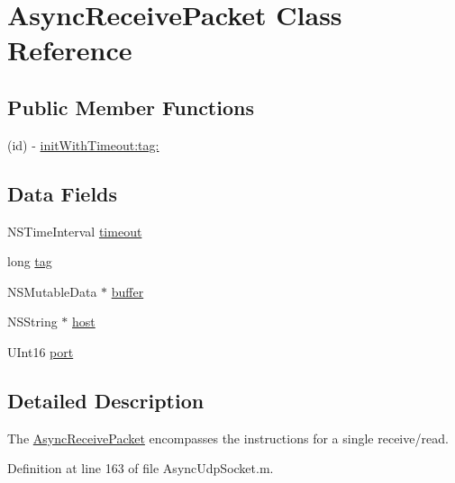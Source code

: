 \hypertarget{interface_async_receive_packet}{
\section{AsyncReceivePacket Class Reference}
\label{interface_async_receive_packet}
}
\subsection*{Public Member Functions}
\begin{DoxyCompactItemize}
\item 
(id) -\/ \hyperlink{interface_async_receive_packet_a71e2dd4924c54776dfe148cf0ad418fb}{initWithTimeout:tag:}
\end{DoxyCompactItemize}
\subsection*{Data Fields}
\begin{DoxyCompactItemize}
\item 
NSTimeInterval \hyperlink{interface_async_receive_packet_a39233eb85b4cbae04411577510e7c5e6}{timeout}
\item 
long \hyperlink{interface_async_receive_packet_ae10c29173f0af40507d7e787905c7130}{tag}
\item 
NSMutableData $\ast$ \hyperlink{interface_async_receive_packet_a7ab0bf89e1cb8317d120c9c44ab611f0}{buffer}
\item 
NSString $\ast$ \hyperlink{interface_async_receive_packet_a3ac3a852ae16fa61160a44386610dec3}{host}
\item 
UInt16 \hyperlink{interface_async_receive_packet_a96ebf7a8d647c5659f83c9f949dfea88}{port}
\end{DoxyCompactItemize}


\subsection{Detailed Description}
The \hyperlink{interface_async_receive_packet}{AsyncReceivePacket} encompasses the instructions for a single receive/read. 

Definition at line 163 of file AsyncUdpSocket.m.



